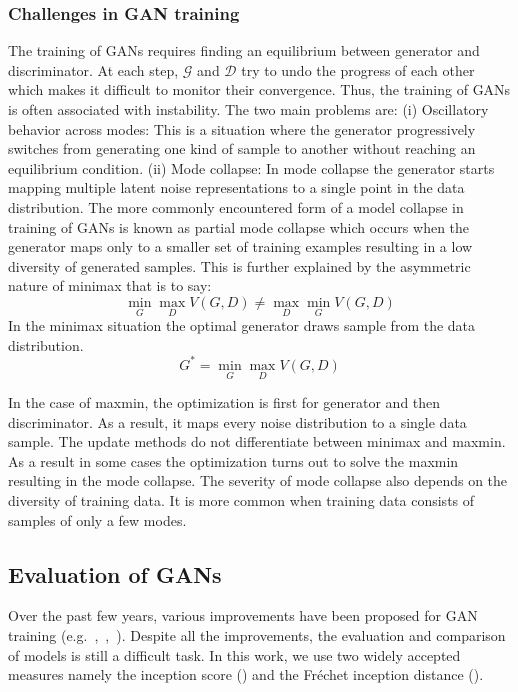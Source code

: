 \subsubsection{Challenges in GAN training}
\label{subsec:ch_gan_train}
The training of GANs requires finding an equilibrium between generator and discriminator. At each step, $\mathcal{G}$ and $\mathcal{D}$ try to undo the progress of each other which makes it difficult to monitor their convergence. Thus, the training of GANs is often associated with instability. The two main problems are: (i) Oscillatory behavior across modes: This is a situation where the generator progressively switches from generating one kind of sample to another without reaching an equilibrium condition. (ii) Mode collapse: In mode collapse the generator starts mapping multiple latent noise representations to a single point in the data distribution. The more commonly encountered form of a model collapse in training of GANs is known as partial mode collapse which occurs when the generator maps only to a smaller set of training examples resulting in a low diversity of generated samples. This is further explained by the asymmetric nature of minimax that is to say:
\begin{equation}
\min_G \max_D V(G,D) \neq \max_D \min_G V(G,D)
\end{equation}
In the minimax situation the optimal generator draws sample from the data distribution. 
\begin{equation}
    G^\ast = \min_G \max_D V(G,D)
\end{equation}

In the case of maxmin, the optimization is first for generator and then discriminator. As a result, it maps every noise distribution to a single data sample. The update methods do not differentiate between minimax and maxmin. As a result in some cases the optimization turns out to solve the maxmin resulting in the mode collapse. The severity of mode collapse also depends on the diversity of training data. It is more common when training data consists of samples of only a few modes. 

\subsection{Evaluation of GANs}
\label{subsec:eval_metrics}
Over the past few years, various improvements have been proposed for GAN training (e.g.~\cite{karras2017progressive},~\cite{arjovsky2017wasserstein},~\cite{petzka2017regularization}). Despite all the improvements, the evaluation and comparison of models is still a difficult task. In this work, we use two widely accepted measures namely the inception score (\cite{salimans2016improved}) and the Fr\'echet inception distance (\cite{heusel2017gans}). 

